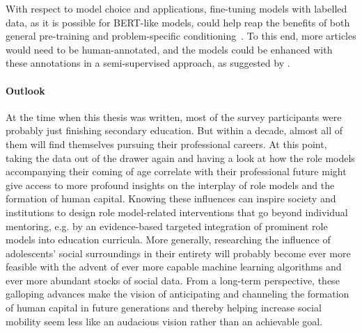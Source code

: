 With respect to model choice and applications, fine-tuning models with labelled data, as it is possible for BERT-like models, could help reap the benefits of both general pre-training and problem-specific conditioning~\autocite{devlin_bert_2019}. To this end, more articles would need to be human-annotated, and the models could be enhanced with these annotations in a semi-supervised approach, as suggested by \textcite{fenske_using_2022}.


\paragraph{Outlook}
At the time when this thesis was written, most of the survey participants were probably just finishing secondary education. But within a decade, almost all of them will find themselves pursuing their professional careers. At this point, taking the data out of the drawer again and having a look at how the role models accompanying their coming of age correlate with their professional future might give access to more profound insights on the interplay of role models and the formation of human capital. Knowing these influences can inspire society and institutions to design role model-related interventions that go beyond individual mentoring, e.g. by an evidence-based targeted integration of prominent role models into education curricula. More generally, researching the influence of adolescents' social surroundings in their entirety will probably become ever more feasible with the advent of ever more capable machine learning algorithms and ever more abundant stocks of social data. From a long-term perspective, these galloping advances make the vision of anticipating and channeling the formation of human capital in future generations and thereby helping increase social mobility seem less like an audacious vision rather than an achievable goal.